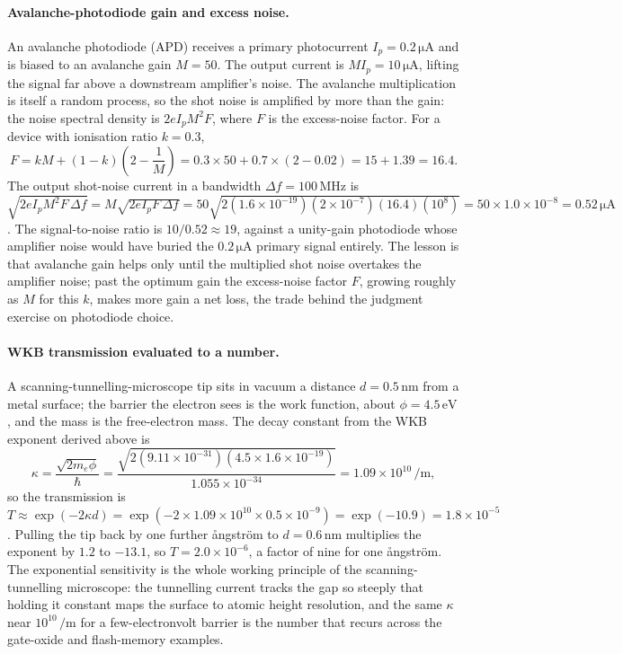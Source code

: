 \paragraph{Avalanche-photodiode gain and excess noise.}
An avalanche photodiode (APD) receives a primary photocurrent $I_p =
0.2\,\si{\micro\ampere}$ and is biased to an avalanche gain $M = 50$. The
output current is $M I_p = 10\,\si{\micro\ampere}$, lifting the signal far
above a downstream amplifier's noise. The avalanche multiplication is
itself a random process, so the shot noise is amplified by more than the
gain: the noise spectral density is $2eI_p M^{2}F$, where $F$ is the
excess-noise factor. For a device with ionisation ratio $k = 0.3$,
\[
F = k M + (1-k)\left(2 - \frac{1}{M}\right)
  = 0.3\times 50 + 0.7\times(2 - 0.02)
  = 15 + 1.39 = 16.4.
\]
The output shot-noise current in a bandwidth $\Delta f = 100\,\si{\mega
\hertz}$ is $\sqrt{2eI_p M^{2}F\,\Delta f} = M\sqrt{2eI_p F\,\Delta f} =
50\sqrt{2(1.6\times 10^{-19})(2\times 10^{-7})(16.4)(10^{8})} =
50\times 1.0\times 10^{-8} = 0.52\,\si{\micro\ampere}$. The signal-to-noise
ratio is $10/0.52 \approx 19$, against a unity-gain photodiode whose
amplifier noise would have buried the $0.2\,\si{\micro\ampere}$ primary
signal entirely. The lesson is that avalanche gain helps only until the
multiplied shot noise overtakes the amplifier noise; past the optimum
gain the excess-noise factor $F$, growing roughly as $M$ for this $k$,
makes more gain a net loss, the trade behind the judgment exercise on
photodiode choice.

\paragraph{WKB transmission evaluated to a number.}
A scanning-tunnelling-microscope tip sits in vacuum a distance $d =
0.5\,\si{\nano\meter}$ from a metal surface; the barrier the electron
sees is the work function, about $\phi = 4.5\,\si{\electronvolt}$, and
the mass is the free-electron mass. The decay constant from the WKB
exponent derived above is
\[
\kappa = \frac{\sqrt{2m_e\phi}}{\hbar}
= \frac{\sqrt{2(9.11\times 10^{-31})(4.5\times 1.6\times 10^{-19})}}
       {1.055\times 10^{-34}}
= 1.09\times 10^{10}\,\si{\per\meter},
\]
so the transmission is $T \approx \exp(-2\kappa d) = \exp(-2\times
1.09\times 10^{10}\times 0.5\times 10^{-9}) = \exp(-10.9) = 1.8\times
10^{-5}$. Pulling the tip back by one further \aa ngstr\"om to $d =
0.6\,\si{\nano\meter}$ multiplies the exponent by $1.2$ to $-13.1$, so
$T = 2.0\times 10^{-6}$, a factor of nine for one \aa ngstr\"om. The
exponential sensitivity is the whole working principle of the
scanning-tunnelling microscope: the tunnelling current tracks the gap
so steeply that holding it constant maps the surface to atomic height
resolution, and the same $\kappa$ near $10^{10}\,\si{\per\meter}$ for a
few-electronvolt barrier is the number that recurs across the gate-oxide
and flash-memory examples.

